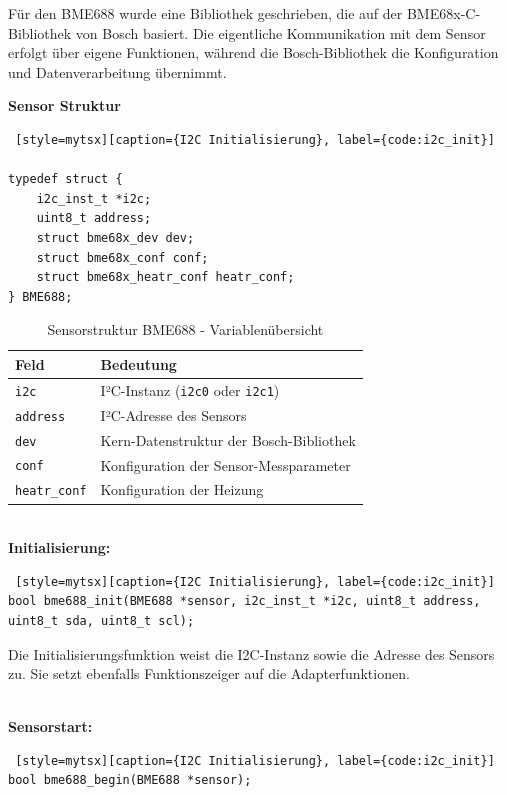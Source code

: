 \begin{inhalt}
Für den BME688 wurde eine Bibliothek geschrieben, die auf der BME68x-C-Bibliothek von Bosch basiert. Die eigentliche Kommunikation mit dem Sensor erfolgt über eigene Funktionen, während die Bosch-Bibliothek die Konfiguration und Datenverarbeitung übernimmt.

\textbf{Sensor Struktur}
\begin{lstlisting} [style=mytsx][caption={I2C Initialisierung}, label={code:i2c_init}]

typedef struct {
    i2c_inst_t *i2c;
    uint8_t address;
    struct bme68x_dev dev;
    struct bme68x_conf conf;
    struct bme68x_heatr_conf heatr_conf;
} BME688;
\end{lstlisting}

\begin{table}[H]
\centering
\renewcommand{\arraystretch}{1.3}
\begin{tabular}{|l|p{11cm}|}
\hline
\rowcolor{cyan!20}
\textbf{Feld} & \textbf{Bedeutung} \\
\hline
\texttt{i2c} & I²C-Instanz (\texttt{i2c0} oder \texttt{i2c1}) \\
\hline
\texttt{address} & I²C-Adresse des Sensors \\
\hline
\texttt{dev} & Kern-Datenstruktur der Bosch-Bibliothek \\
\hline
\texttt{conf} & Konfiguration der Sensor-Messparameter \\
\hline
\texttt{heatr\_conf} & Konfiguration der Heizung \\
\hline
\end{tabular}
\caption{Sensorstruktur BME688 - Variablenübersicht}
\label{tab:bme688_struct}
\end{table}


\bigskip \\
\textbf{Initialisierung:}

\begin{lstlisting} [style=mytsx][caption={I2C Initialisierung}, label={code:i2c_init}]
bool bme688_init(BME688 *sensor, i2c_inst_t *i2c, uint8_t address, uint8_t sda, uint8_t scl);
\end{lstlisting}

Die Initialisierungsfunktion weist die I2C-Instanz sowie die Adresse des Sensors zu. Sie setzt ebenfalls Funktionszeiger auf die Adapterfunktionen. 

\bigskip \\
\textbf{Sensorstart:}

\begin{lstlisting} [style=mytsx][caption={I2C Initialisierung}, label={code:i2c_init}]
bool bme688_begin(BME688 *sensor);
\end{lstlisting}


\end{inhalt}
